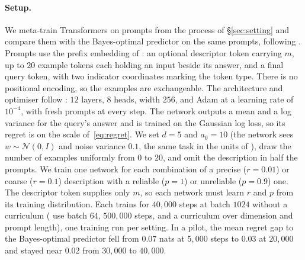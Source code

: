 \documentclass[10pt]{article}
\begin{document}
\paragraph{Setup.}
We meta-train Transformers on prompts from the process of \S\ref{sec:setting} and compare them with the Bayes-optimal predictor on the same prompts, following \citet{genewein2025}. Prompts use the prefix embedding of \citet{huangge2025}: an optional descriptor token carrying $m$, up to $20$ example tokens each holding an input beside its answer, and a final query token, with two indicator coordinates marking the token type. There is no positional encoding, so the examples are exchangeable. The architecture and optimiser follow \citet{garg2022}: $12$ layers, $8$ heads, width $256$, and Adam at a learning rate of $10^{-4}$, with fresh prompts at every step. The network outputs a mean and a log variance for the query's answer and is trained on the Gaussian log loss, so its regret is on the scale of~\eqref{eq:regret}. We set $d = 5$ and $a_0 = 10$ (the network sees $w \sim \mathcal{N}(0, I)$ and noise variance $0.1$, the same task in the units of \citet{garg2022}), draw the number of examples uniformly from $0$ to $20$, and omit the description in half the prompts. We train one network for each combination of a precise ($r = 0.01$) or coarse ($r = 0.1$) description with a reliable ($p = 1$) or unreliable ($p = 0.9$) one. The descriptor token supplies only $m$, so each network must learn $r$ and $p$ from its training distribution. Each trains for $40{,}000$ steps at batch $1024$ without a curriculum (\citet{garg2022} use batch $64$, $500{,}000$ steps, and a curriculum over dimension and prompt length), one training run per setting. In a pilot, the mean regret gap to the Bayes-optimal predictor fell from $0.07$ nats at $5{,}000$ steps to $0.03$ at $20{,}000$ and stayed near $0.02$ from $30{,}000$ to $40{,}000$.
\end{document}
